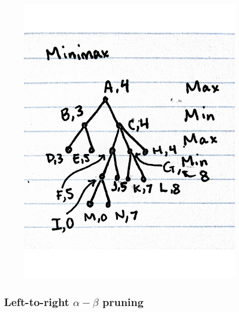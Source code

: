 \documentclass[11pt]{article}
\begin{document}
\begin{figure}[H]
\centering
\includegraphics[scale=.5]{minimax.pdf}
\end{figure}

\subsection{Left-to-right $\alpha-\beta$ pruning}
\end{document}
